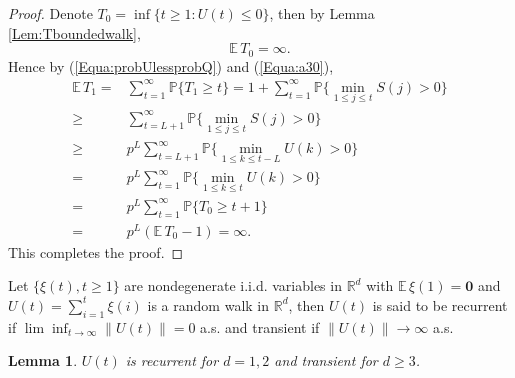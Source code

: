 \documentclass[11pt]{article}
\newtheorem{lem}[thm]{Lemma}
\theoremstyle{definition}
\theoremstyle{remark}
\numberwithin{equation}{section}
\begin{document}
\begin{proof}
Denote $T_0=\inf\{t\geq 1: U(t)\leq 0\}$, then by Lemma \ref{Lem:Tboundedwalk},
\begin{equation}\label{Equa:a30}
  \mathbb{E}\,T_0=\infty.
\end{equation}
Hence by (\ref{Equa:probUlessprobQ}) and (\ref{Equa:a30}),
\begin{equation*}
  \begin{split}
  \mathbb{E}\,T_1=&\sum\limits_{t=1}^\infty\mathbb{P}\{T_1\geq t\}=1+\sum\limits_{t=1}^\infty\mathbb{P}\Big\{\min_{1\leq j\leq t} S(j)>0\Big\}\\
  \geq&\sum\limits_{t=L+1}^\infty\mathbb{P}\Big\{\min_{1\leq j\leq t} S(j)>0\Big\}\\
  \geq& p^L\sum\limits_{t=L+1}^\infty\mathbb{P}\Big\{\min_{1\leq k\leq t-L}U(k)>0\Big\}\\
  =&p^L\sum\limits_{t=1}^\infty\mathbb{P}\Big\{\min_{1\leq k\leq t}U(k)>0\Big\}\\
  =&p^L\sum\limits_{t=1}^\infty\mathbb{P}\{T_0\geq t+1\}\\
  =&p^L(\mathbb{E}\,T_0-1)=\infty.
  \end{split}
\end{equation*}
This completes the proof.
\end{proof}

Let $\{\xi(t), t\geq 1\}$ are nondegenerate i.i.d. variables in $\mathbb{R}^d$ with $\mathbb{E}\,\xi(1)=\textbf{0}$ and $U(t)=\sum_{i=1}^{t}\xi(i)$ is a random walk in $\mathbb{R}^d$, then $U(t)$ is said to be recurrent if $\lim\inf_{t\rightarrow\infty}\|U(t)\|=0$ a.s. and transient if $\|U(t)\|\rightarrow\infty$ a.s.
\begin{lem}\cite{Kallenberg2001}\label{Lem:recurrencerw}
$U(t)$ is recurrent for $d=1,2$ and transient for $d\geq 3$.
\end{lem}
\end{document}
